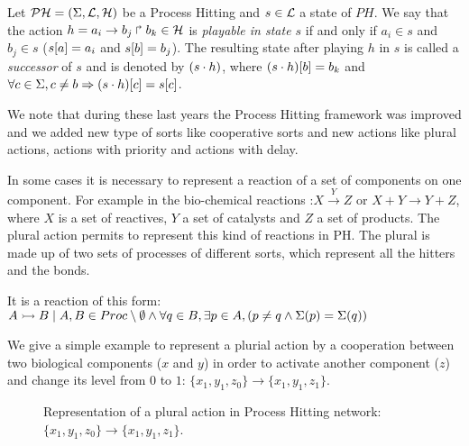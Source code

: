 \begin{definition} 
\label{def:playableAction}
Let $\mathcal{PH} = (\Sigma,\mathcal{L},\mathcal{H})$ be a Process Hitting and $s \in \mathcal{L}$ a state of $PH$.
We say that the action $h = a_i\rightarrow b_j\Rsh b_k \in \mathcal{H}$
is \emph{playable in state $s$} if and only if
$a_i \in s$ and $b_j \in s$ (\ie ${s[a]} = a_i$ and ${s[b]}=b_j$).
The resulting state after playing $h$ in $s$
is called a \emph{successor} of $s$ and
is denoted by $(s \cdot h)$,
where ${(s \cdot h)[b]} = b_k$ and
$\forall c \in \Sigma, c \neq b \Rightarrow {(s \cdot h)[c]}={s[c]}$.
\end{definition}

We note that during these last years the Process Hitting framework was improved and we added new type of sorts like cooperative sorts and new actions like plural actions, actions with priority and actions with delay.

In some cases it is necessary to represent a reaction of a set of components on one component. For example in the bio-chemical reactions :$X \xrightarrow{Y} Z$ or  $X + Y \rightarrow Y + Z$, where $ X $ is a set of reactives, $ Y $ a set of catalysts and $ Z $ a set of products.%
The plural action permits to represent this kind of reactions in PH. The plural is made up of two sets of processes of different sorts, which represent all the hitters and the bonds.

\begin{definition}
\label{def:pluralAction}
It is a reaction of this form: \\
 $ \mbox{$A \rightarrowtail B$} \mid A, B \in Proc \setminus \emptyset \wedge \forall q \in B, \exists p \in A, (p \neq q \wedge \Sigma(p) = \Sigma(q)) $
\end{definition}

\begin{example*}
We give a simple example to represent a plurial action by a cooperation between two biological components ($x$ and $y$) in order to activate another component ($z$) and change its level from $0$ to $1$: $\{x_1, y_1, z_0 \} \rightarrow \{x_1, y_1, z_1 \} $.

\begin{figure}[ht]
\label{fig:ph-plurial} 
\centering
{}
\caption{
Representation of a plural action in Process Hitting network: $\{x_1, y_1, z_0 \} \rightarrow \{x_1, y_1, z_1 \} $. 
}

\end{figure}
\end{example*}

